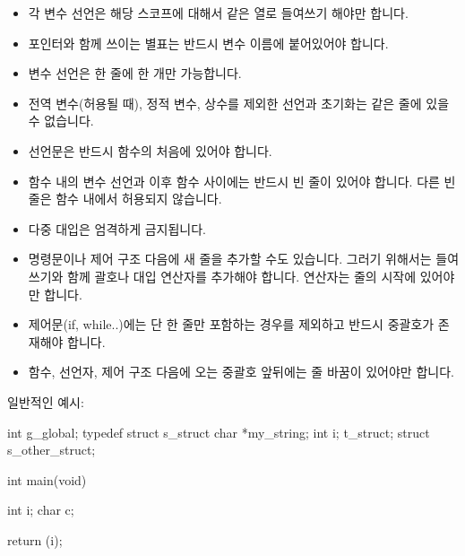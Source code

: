 \documentclass{42-ko}
\begin{document}
\begin{itemize}
                \item 각 변수 선언은 해당 스코프에 대해서 같은 열로 들여쓰기 해야만 합니다.

                \item 포인터와 함께 쓰이는 별표는 반드시 변수 이름에 붙어있어야 합니다.

                \item 변수 선언은 한 줄에 한 개만 가능합니다.

                \item 전역 변수(허용될 때), 정적 변수, 상수를 제외한
                  선언과 초기화는 같은 줄에 있을 수 없습니다.

                \item 선언문은 반드시 함수의 처음에 있어야 합니다.

                \item 함수 내의 변수 선언과 이후 함수 사이에는 반드시 빈 줄이
                  있어야 합니다. 다른 빈 줄은 함수 내에서 허용되지 않습니다.

                \item 다중 대입은 엄격하게 금지됩니다.

                \item 명령문이나 제어 구조 다음에 새 줄을 추가할 수도 있습니다.
                  그러기 위해서는 들여쓰기와 함께 괄호나 대입 연산자를
                  추가해야 합니다. 연산자는 줄의 시작에 있어야만 합니다.

                \item 제어문(if, while..)에는 단 한 줄만 포함하는 경우를 제외하고
                  반드시 중괄호가 존재해야 합니다.

                \item 함수, 선언자, 제어 구조 다음에 오는 중괄호 앞뒤에는 줄 바꿈이 있어야만 합니다.

            \end{itemize}

            \newpage

            일반적인 예시:
            \begin{42ccode}
int             g_global;
typedef struct  s_struct
{
    char    *my_string;
    int     i;
}               t_struct;
struct          s_other_struct;

int     main(void)
{
    int     i;
    char    c;

    return (i);
}
            \end{42ccode}
            \newpage
\end{document}
